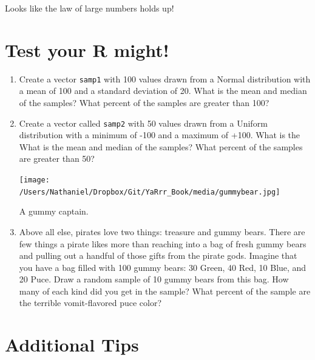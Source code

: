 \documentclass{tufte-book}\usepackage[]{graphicx}\usepackage[]{color}
\begin{document}
Looks like the law of large numbers holds up!


\section{Test your R might!}

\begin{enumerate}

\item Create a vector \texttt{samp1} with 100 values drawn from a Normal distribution with a mean of 100 and a standard deviation of 20. What is the mean and median of the samples? What percent of the samples are greater than 100?

\item Create a vector called \texttt{samp2} with 50 values drawn from a Uniform distribution with a minimum of -100 and a maximum of +100. What is the What is the mean and median of the samples? What percent of the samples are greater than 50?


\begin{marginfigure}
\texttt{[image: /Users/Nathaniel/Dropbox/Git/YaRrr\_Book/media/gummybear.jpg]}
\caption{A gummy captain.}
\label{fig:gummy}
\end{marginfigure}


\item Above all else, pirates love two things: treasure and gummy bears. There are few things a pirate likes more than reaching into a bag of fresh gummy bears and pulling out a handful of those gifts from the pirate gods. Imagine that you have a bag filled with 100 gummy bears: 30 Green, 40 Red, 10 Blue, and 20 Puce. Draw a random sample of 10 gummy bears from this bag. How many of each kind did you get in the sample? What percent of the sample are the terrible vomit-flavored puce color?


\end{enumerate}


\section{Additional Tips}
\end{document}
